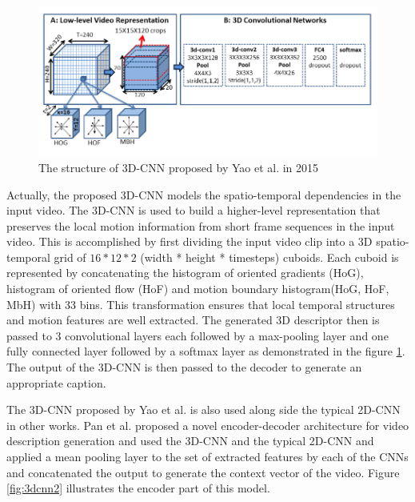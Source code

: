 \documentclass[preprint, 12pt]{elsarticle}
\begin{document}
		\begin{figure}[h]
			\centering
			\includegraphics[scale=0.5]{Imgs/3DCNN.png}
			\caption{The structure of 3D-CNN proposed by Yao et al. in 2015 \cite{yao2015describing}}
			\label{fig:3dcnn}
		\end{figure}
	
		Actually, the proposed 3D-CNN models the spatio-temporal dependencies in the input video. The 3D-CNN is used to build a higher-level representation that preserves the local motion information from short frame sequences in the input video. This is accomplished by first dividing the input video clip into a 3D spatio-temporal grid of $16 * 12 * 2$ (width * height * timesteps) cuboids. Each cuboid is represented by concatenating the histogram of oriented gradients (HoG), histogram of oriented flow (HoF) and motion boundary histogram(HoG, HoF, MbH) with 33 bins. This transformation ensures that local temporal structures and motion features are well extracted. The generated 3D descriptor then is passed to 3 convolutional layers each followed by a max-pooling layer and one fully connected layer followed by a softmax layer as demonstrated in the figure \ref{fig:3dcnn}. The output of the 3D-CNN is then passed to the decoder to generate an appropriate caption.
		
		The 3D-CNN proposed by Yao et al. \cite{yao2015describing} is also used along side the typical 2D-CNN in other works. Pan et al. \cite{pan2016jointly} proposed a novel encoder-decoder architecture for video description generation and used the 3D-CNN and the typical 2D-CNN and applied a mean pooling layer to the set of extracted features by each of the CNNs and concatenated the output to generate the context vector of the video. Figure \ref{fig:3dcnn2} illustrates the encoder part of this model.
		
\end{document}
